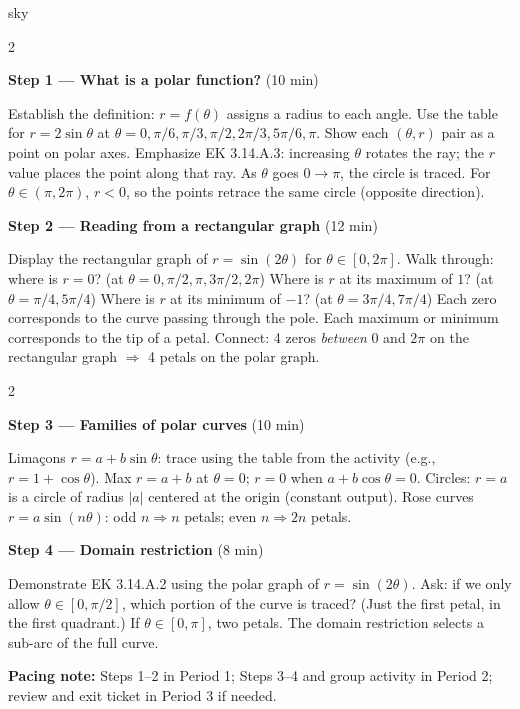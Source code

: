 \documentclass[10pt]{article}
\begin{document}
\begin{skillbox}{sky}
\begin{multicols}{2}

\textbf{Step 1 --- What is a polar function?} (10 min)

Establish the definition: $r = f(\theta)$ assigns a radius to each angle.
Use the table for $r = 2\sin\theta$ at $\theta = 0, \pi/6, \pi/3, \pi/2, 2\pi/3,
5\pi/6, \pi$. Show each $(\theta, r)$ pair as a point on polar axes.
Emphasize EK 3.14.A.3: increasing $\theta$ rotates the ray; the $r$ value
places the point along that ray. As $\theta$ goes $0 \to \pi$, the circle
is traced. For $\theta \in (\pi, 2\pi)$, $r < 0$, so the points retrace
the same circle (opposite direction).

\columnbreak

\textbf{Step 2 --- Reading from a rectangular graph} (12 min)

Display the rectangular graph of $r = \sin(2\theta)$ for $\theta \in [0, 2\pi]$.
Walk through: where is $r = 0$? (at $\theta = 0, \pi/2, \pi, 3\pi/2, 2\pi$)
Where is $r$ at its maximum of $1$? (at $\theta = \pi/4, 5\pi/4$)
Where is $r$ at its minimum of $-1$? (at $\theta = 3\pi/4, 7\pi/4$)
Each zero corresponds to the curve passing through the pole.
Each maximum or minimum corresponds to the tip of a petal.
Connect: 4 zeros \emph{between} $0$ and $2\pi$ on the rectangular graph
$\Rightarrow$ 4 petals on the polar graph.

\end{multicols}

\begin{multicols}{2}

\textbf{Step 3 --- Families of polar curves} (10 min)

Limaçons $r = a + b\sin\theta$: trace using the table from the activity
(e.g., $r = 1 + \cos\theta$). Max $r = a + b$ at $\theta = 0$; $r = 0$
when $a + b\cos\theta = 0$. Circles: $r = a$ is a circle of radius $|a|$
centered at the origin (constant output).
Rose curves $r = a\sin(n\theta)$: odd $n \Rightarrow n$ petals;
even $n \Rightarrow 2n$ petals.

\columnbreak

\textbf{Step 4 --- Domain restriction} (8 min)

Demonstrate EK 3.14.A.2 using the polar graph of $r = \sin(2\theta)$.
Ask: if we only allow $\theta \in [0, \pi/2]$, which portion of the curve
is traced? (Just the first petal, in the first quadrant.)
If $\theta \in [0, \pi]$, two petals. The domain restriction selects a
sub-arc of the full curve.

\end{multicols}

\smallskip
\textbf{Pacing note:} Steps 1--2 in Period 1; Steps 3--4 and group activity
in Period 2; review and exit ticket in Period 3 if needed.
\end{skillbox}
\end{document}
